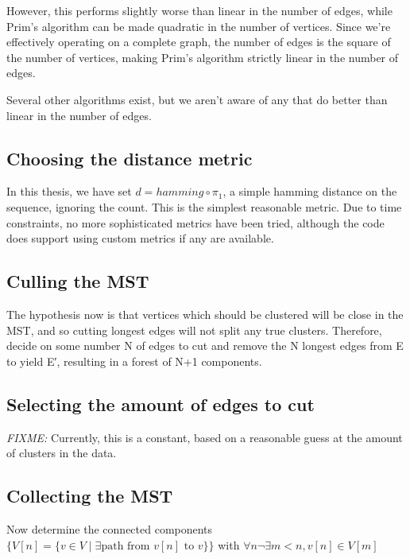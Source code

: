 \documentclass[fleqn]{book}
\begin{document}
However, this performs slightly worse than linear in the number of
edges, while Prim's algorithm can be made quadratic in the number of
vertices. Since we're effectively operating on a complete graph, the
number of edges is the square of the number of vertices, making Prim's
algorithm strictly linear in the number of edges.

Several other algorithms exist, but we aren't aware of any that do
better than linear in the number of edges.

\subsection{Choosing the distance
metric}\label{choosing-the-distance-metric}

In this thesis, we have set \(d = hamming \circ \pi_1\), a simple
hamming distance on the sequence, ignoring the count. This is the
simplest reasonable metric. Due to time constraints, no more
sophisticated metrics have been tried, although the code does support
using custom metrics if any are available.

\subsection{Culling the MST}\label{culling-the-mst}

The hypothesis now is that vertices which should be clustered will be
close in the MST, and so cutting longest edges will not split any true
clusters. Therefore, decide on some number N of edges to cut and remove
the N longest edges from E to yield E′, resulting in a forest of N+1
components.

\subsection{Selecting the amount of edges to
cut}\label{selecting-the-amount-of-edges-to-cut}

\emph{FIXME:} Currently, this is a constant, based on a reasonable guess
at the amount of clusters in the data.

\subsection{Collecting the MST}\label{collecting-the-mst}

Now determine the connected components
\(\{V[n] = \{v ∈ V \mid ∃ \text{path from } v[n] \text{ to } v\}\}\)
with \(∀n ¬∃m<n, v[n] ∈ V[m]\)
\end{document}
